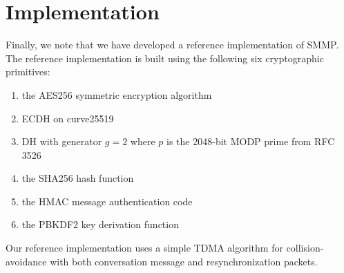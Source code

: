 \documentclass[%
preprint,
amsmath,amssymb,
aps,
prb,
floatfix,
]{revtex4-1}
\begin{document}
\section{\label{sec:implementation}Implementation}
Finally, we note that we have developed a reference
implementation\cite{ref:referenceimplementation} of SMMP.
The reference implementation is built using the following six cryptographic
primitives:
\begin{enumerate}
\item the AES256 symmetric encryption algorithm
\item ECDH on curve25519
\item DH with generator $g=2$ where $p$ is the 2048-bit MODP prime from RFC 3526
\item the SHA256 hash function
\item the HMAC message authentication code
\item the PBKDF2 key derivation function
\end{enumerate}
Our reference implementation uses a simple TDMA algorithm for
collision-avoidance with both conversation message and resynchronization
packets.
\end{document}

